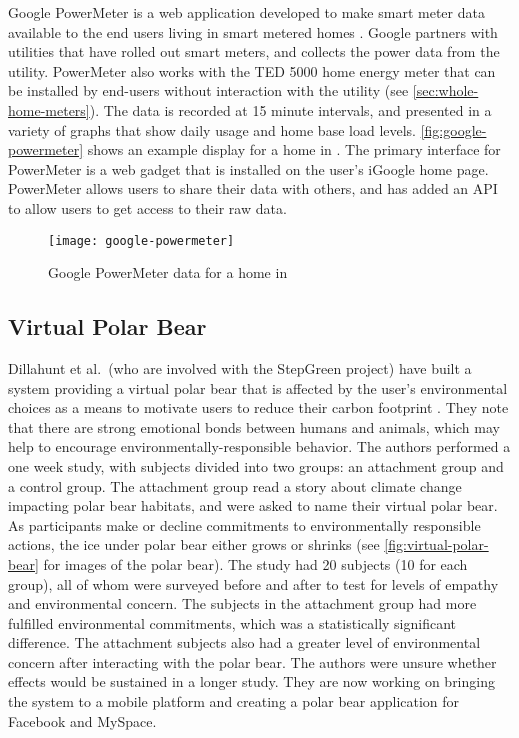 Google PowerMeter is a web application developed to make smart meter data available to the end users living in smart metered homes \cite{Google-PowerMeter}. Google partners with utilities that have rolled out smart meters, and collects the power data from the utility. PowerMeter also works with the TED 5000 home energy meter that can be installed by end-users without interaction with the utility (see \autoref{sec:whole-home-meters}). The data is recorded at 15 minute intervals, and presented in a variety of graphs that show daily usage and home base load levels. \autoref{fig:google-powermeter} shows an example display for a home in \Hawaii. The primary interface for PowerMeter is a web gadget that is installed on the user's iGoogle home page. PowerMeter allows users to share their data with others, and has added an API to allow users to get access to their raw data.

\begin{figure}[htbp]
	\centering
		\texttt{[image: google-powermeter]}
		\caption{Google PowerMeter data for a home in \Hawaii}
		\label{fig:google-powermeter}
\end{figure}


\subsection{Virtual Polar Bear}
\label{sec:virtual-polar-bear}

Dillahunt et al.\ (who are involved with the StepGreen project) have built a system providing a virtual polar bear that is affected by the user's environmental choices as a means to motivate users to reduce their carbon footprint \cite{dillahunt-virtual-polar-bear-2008}. They note that there are strong emotional bonds between humans and animals, which may help to encourage environmentally-responsible behavior. The authors performed a one week study, with subjects divided into two groups: an attachment group and a control group. The attachment group read a story about climate change impacting polar bear habitats, and were asked to name their virtual polar bear. As participants make or decline commitments to environmentally responsible actions, the ice under polar bear either grows or shrinks (see \autoref{fig:virtual-polar-bear} for images of the polar bear). The study had 20 subjects (10 for each group), all of whom were surveyed before and after to test for levels of empathy and environmental concern. The subjects in the attachment group had more fulfilled environmental commitments, which was a statistically significant difference. The attachment subjects also had a greater level of environmental concern after interacting with the polar bear. The authors were unsure whether effects would be sustained in a longer study. They are now working on bringing the system to a mobile platform and creating a polar bear application for Facebook and MySpace.

